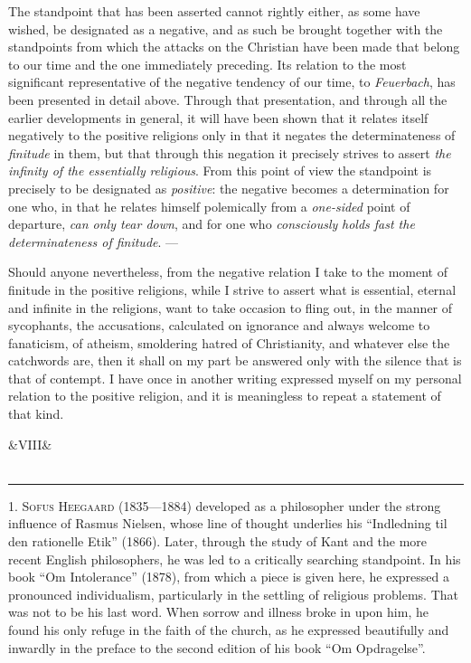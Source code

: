 \documentclass[12pt,a4paper,openany]{book}
\newcommand{\opage}[1]{\marginnote{\footnotesize\textit{[#1]}}}
\newcommand{\anthsection}[2]{\clearpage\begin{center}\ifx&#1&\else{\large #1}\\[0.6em]\fi{\Large #2}\\[0.5em]\rule{3em}{0.4pt}\end{center}\medskip}
\newenvironment{intro}{\par}{\par}
\begin{document}
The standpoint that has been asserted cannot rightly either, as some have wished, be
designated as a negative, and as such be brought together with the standpoints
from which the attacks on the Christian have been made that belong to our time and the
one immediately preceding. Its relation to the most significant representative of the
negative tendency of our time, to \emph{Feuerbach}, has been presented in detail above.
Through that presentation, and through all the earlier developments in general, it will
have been shown that it relates itself negatively to the positive religions only in that
it negates the determinateness of \emph{finitude} in them, but that through
this negation it precisely strives to assert \emph{the infinity of the essentially}
\emph{religious}. From this point of view the standpoint is precisely to be designated
as \emph{positive}: the negative becomes a determination for one who, in that he
relates himself polemically from a \emph{one-sided} point of departure,
\emph{can only tear down}, and for one who \emph{consciously}
\emph{holds fast the determinateness of finitude}. ---

Should anyone nevertheless, from the negative relation I take to the moment of
finitude in the positive religions, while I strive to assert what is essential,
eternal and infinite in the religions, want to take occasion to fling out, in the
manner of sycophants,
\setcounter{footnote}{0}%
\opage{221}the accusations, calculated on ignorance and always welcome to fanaticism, of
atheism, smoldering hatred of Christianity, and whatever else the catchwords are, then
it shall on my part be answered only with the silence that is that of contempt. I have
once in another writing expressed myself on my personal relation to the positive
religion, and it is meaningless to repeat a statement of that kind.

\setcounter{footnote}{0}%
\anthsection{VIII} {THE LAST GENERATION}\opage{222}

\begin{intro}

1. \textsc{Sofus Heegaard} (1835---1884) developed as a philosopher under the strong
influence of Rasmus Nielsen, whose line of thought underlies his ``Indledning til den
rationelle Etik'' (1866). Later, through the study of Kant and the more recent English
philosophers, he was led to a critically searching standpoint. In his book ``Om
Intolerance'' (1878), from which a piece is given here, he expressed a pronounced
individualism, particularly in the settling of religious problems. That was not to be
his last word. When sorrow and illness broke in upon him, he found his only refuge in
the faith of the church, as he expressed beautifully and inwardly in the preface to the
second edition of his book ``Om Opdragelse''.
\end{intro}
\end{document}

